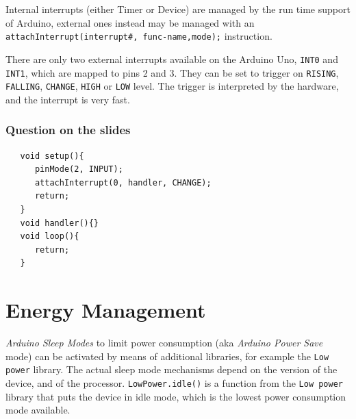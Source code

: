 Internal interrupts (either Timer or Device) are managed by
the run time support of Arduino, external ones instead may be managed with an \lstinline|attachInterrupt(interrupt#, func-name,mode);| instruction.

There are only two external interrupts available on the Arduino Uno, \texttt{INT0} and \texttt{INT1}, which are mapped to pins 2 and 3.
They can be set to trigger on \texttt{RISING}, \texttt{FALLING}, \texttt{CHANGE}, \texttt{HIGH} or \texttt{LOW} level.
The trigger is interpreted by the hardware, and the interrupt is very fast.

\subsubsection*{Question on the slides}
\begin{lstlisting}
   void setup(){
      pinMode(2, INPUT);
      attachInterrupt(0, handler, CHANGE);
      return;
   }
   void handler(){}
   void loop(){
      return;
   }
\end{lstlisting}

\section{Energy Management}
\textit{Arduino Sleep Modes} to limit power consumption (aka \textit{Arduino Power Save} mode) can be activated by means of additional libraries, for example the \texttt{Low power} library.
The actual sleep mode mechanisms depend on the version of the device, and of the processor.
\lstinline|LowPower.idle()| is a function from the \texttt{Low power} library that puts the device in idle mode, which is the lowest power consumption mode available.